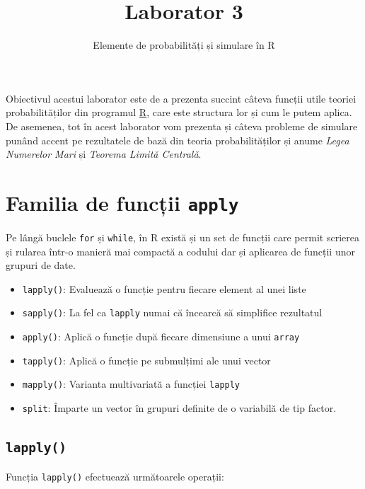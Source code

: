 \documentclass[]{article}
\title{Laborator 3}
\subtitle{Elemente de probabilități și simulare în R}
\author{}
\date{}
\begin{document}
\maketitle

\thispagestyle{fancy}

Obiectivul acestui laborator este de a prezenta succint câteva funcții
utile teoriei probabilităților din programul
\href{https://cran.r-project.org/}{R}, care este structura lor și cum le
putem aplica. De asemenea, tot în acest laborator vom prezenta și câteva
probleme de simulare punând accent pe rezultatele de bază din teoria
probabilităților și anume \emph{Legea Numerelor Mari} și \emph{Teorema
Limită Centrală}.

\section{\texorpdfstring{Familia de funcții
\texttt{apply}}{Familia de funcții apply}}\label{familia-de-functii-apply}

Pe lângă buclele \texttt{for} și \texttt{while}, în R există și un set
de funcții care permit scrierea și rularea într-o manieră mai compactă a
codului dar și aplicarea de funcții unor grupuri de date.

\begin{itemize}
\item
  \texttt{lapply()}: Evaluează o funcție pentru fiecare element al unei
  liste
\item
  \texttt{sapply()}: La fel ca \texttt{lapply} numai că încearcă să
  simplifice rezultatul
\item
  \texttt{apply()}: Aplică o funcție după fiecare dimensiune a unui
  \texttt{array}
\item
  \texttt{tapply()}: Aplică o funcție pe submulțimi ale unui vector
\item
  \texttt{mapply()}: Varianta multivariată a funcției \texttt{lapply}
\item
  \texttt{split}: Împarte un vector în grupuri definite de o variabilă
  de tip factor.
\end{itemize}

\subsection{\texorpdfstring{\texttt{lapply()}}{lapply()}}\label{lapply}

Funcția \texttt{lapply()} efectuează următoarele operații:
\end{document}
